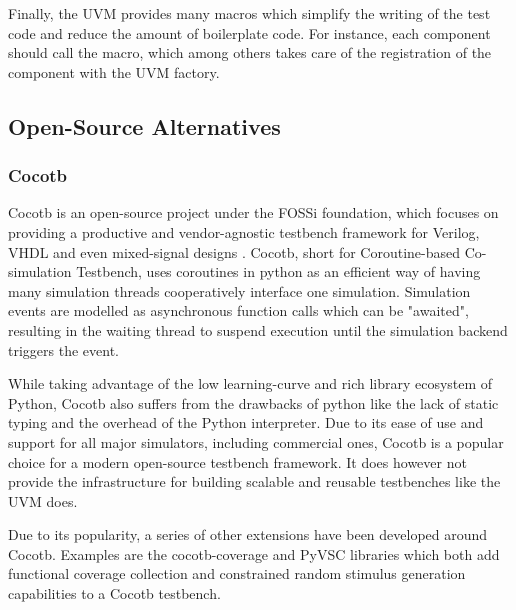 Finally, the UVM provides many macros which simplify the writing of the test code and reduce the amount of
boilerplate code. For instance, each component should call the  macro, which among
others takes care of the registration of the component with the UVM factory.


\subsection{Open-Source Alternatives} %


\subsubsection{Cocotb} %

Cocotb is an open-source project under the FOSSi foundation, which focuses on providing a productive and
vendor-agnostic testbench framework for Verilog, VHDL and even mixed-signal designs \cite{cocotb}. Cocotb, short for
Coroutine-based Co-simulation Testbench, uses coroutines in python as an efficient way of having many simulation
threads cooperatively interface one simulation. Simulation events are modelled as asynchronous function calls which
can be "awaited", resulting in the waiting thread to suspend execution until the simulation backend triggers the event.

While taking advantage of the low learning-curve and rich library ecosystem of Python, Cocotb also suffers from the
drawbacks of python like the lack of static typing and the overhead of the Python interpreter. Due to its ease of use
and support for all major simulators, including commercial ones, Cocotb is a popular choice for a modern open-source
testbench framework. It does however not provide the infrastructure for building scalable and reusable testbenches
like the UVM does.

Due to its popularity, a series of other extensions have been developed around Cocotb. Examples are the
cocotb-coverage \cite{crvpython} and PyVSC \cite{pyvsc} libraries which both add functional coverage collection and
constrained random stimulus generation capabilities to a Cocotb testbench.


